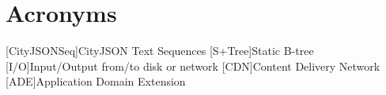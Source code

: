 
\chapter*{Acronyms}

\begin{acronym}[UML]
  [CityJSONSeq]{CityJSON Text Sequences}
  [S+Tree]{Static B-tree}
  [I/O]{Input/Output from/to disk or network}
  [CDN]{Content Delivery Network}
  [ADE]{Application Domain Extension}
\end{acronym}